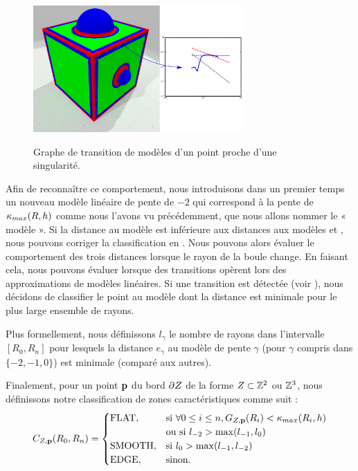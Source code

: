 \begin{figure}
\begin{center}
  {\includegraphics[width=8cm]{figures/CubeSpherePlot_transition}}
  \caption{Graphe de transition de modèles d'un point proche d'une singularité.}
  \label{fig:inversion}
\end{center}
\end{figure}

Afin de reconnaître ce comportement, nous introduisons dans un premier temps un
nouveau modèle linéaire de pente de $-2$ qui correspond à la pente de
$\kappa_{max}(R,h)$ comme nous l'avons vu précédemment, que nous allons nommer le «
modèle \featflat ». Si la distance au modèle \featflat est inférieure aux
distances aux modèles \featsmooth et \featedge, nous pouvons corriger la
classification en \featflat. Nous pouvons alors évaluer le comportement des
trois distances lorsque le rayon de la boule change. En faisant cela, nous
pouvons évaluer lorsque des transitions opèrent lors des approximations de
modèles linéaires. Si une transition est détectée (voir
), nous décidons de classifier le point au modèle dont
la distance est minimale pour le plus large ensemble de rayons.


Plus formellement, nous définissons $l_{\gamma}$ le nombre de rayons dans
l'intervalle $[R_0,R_n]$ pour lesquels la distance $e_\gamma$ au modèle de pente
$\gamma$ (pour $\gamma$ compris dans $\{-2, -1, 0\}$) est minimale (comparé aux
autres).


Finalement, pour un point $\mathbf{p}$ du bord $\partial Z$ de la forme $Z \subset \mathbb{Z}^2$ ou $\mathbb{Z}^3$, nous
définissons notre classification de zones caractéristiques comme suit :
%
\begin{equation}
 C_{Z,\mathbf{p}}(R_0, R_n) =
  \begin{cases}
      \text{FLAT},         & \text{si } \forall 0 \leq i \leq n,    G_{Z,\mathbf{p}}(R_i) < \kappa_{max}(R_i,h) \\
                           & \text{ou si } l_{-2} > \max( l_{-1}, l_{0} )\\
      \text{SMOOTH},       & \text{si } l_{0}> \max( l_{-1}, l_{-2} )\\
      \text{EDGE},        & \text{sinon.}
  \end{cases}
\end{equation}
%
